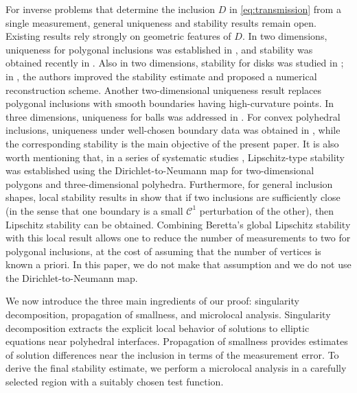 ﻿\documentclass[11pt,reqno,oneside]{amsart}
\theoremstyle{definition}
\theoremstyle{remark}
\newcommand{\Cont}{\mathcal{C}}
\begin{document}
For inverse problems that determine the inclusion $D$ in \eqref{eq:transmission} from a single measurement, general uniqueness and stability results remain open. Existing results rely strongly on geometric features of $D$. In two dimensions, uniqueness for polygonal inclusions was established in \cite{Friedman1989,Seo1995}, and stability was obtained recently in \cite{moi5}. Also in two dimensions, stability for disks was studied in \cite{Fabes1999}; in \cite{moi2}, the authors improved the stability estimate and proposed a numerical reconstruction scheme. Another two-dimensional uniqueness result \cite{moi6} replaces polygonal inclusions with smooth boundaries having high-curvature points. In three dimensions, uniqueness for balls was addressed in \cite{Kang1999ball}. For convex polyhedral inclusions, uniqueness under well-chosen boundary data was obtained in \cite{Barcelo1994}, while the corresponding stability is the main objective of the present paper. It is also worth mentioning that, in a series of systematic studies \cite{Beretta2022,Beretta2021,Aspri2022}, Lipschitz-type stability was established using the Dirichlet-to-Neumann map for two-dimensional polygons and three-dimensional polyhedra. Furthermore, for general inclusion shapes, local stability results in \cite{Bellout1992,Choulli2003,Choulli2006} show that if two inclusions are sufficiently close (in the sense that one boundary is a small $\Cont^1$ perturbation of the other), then Lipschitz stability can be obtained. Combining Beretta's global Lipschitz stability with this local result allows one to reduce the number of measurements to two \cite{Hanke2024} for polygonal inclusions, at the cost of assuming that the number of vertices is known a priori. In this paper, we do not make that assumption and we do not use the Dirichlet-to-Neumann map.

We now introduce the three main ingredients of our proof: singularity decomposition, propagation of smallness, and microlocal analysis. Singularity decomposition extracts the explicit local behavior of solutions to elliptic equations near polyhedral interfaces. Propagation of smallness provides estimates of solution differences near the inclusion in terms of the measurement error. To derive the final stability estimate, we perform a microlocal analysis in a carefully selected region with a suitably chosen test function.
\end{document}
